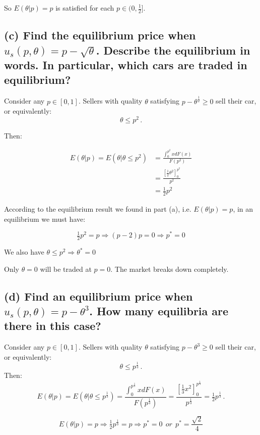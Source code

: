 \documentclass{article}
\begin{document}
So $E(\theta | p) = p$ is satisfied for each $p \in (0,\tfrac12]$.

\subsection*{(c) Find the equilibrium price when $u_s(p, \theta) = p - \sqrt{\theta}$. Describe the equilibrium in words. In
particular, which cars are traded in equilibrium?}

Consider any $p \in [0,1]$. Sellers with quality $\theta$ satisfying $p - \theta^\frac12 \geq 0$ sell their car, or equivalently:$$\theta \leq p^2 \, .$$

Then:

\begin{align*}
E(\theta | p) = E(\theta | \theta \leq p^2) &= \frac{\int_{0}^{p^2}x dF(x)}{F(p^2)} \\
&= \frac{\left[ \tfrac12 \theta^2 \right]^{p^2}_0}{p^2} \\
&= \tfrac12 p^2
\end{align*}

According to the equilibrium result we found in part (a), i.e.
$E(\theta | p) = p$, in an equilibrium we must have:

$$\tfrac12 p^2 = p \Rightarrow (p-2)p = 0 \Rightarrow p^* = 0$$ 

We also have $\theta \leq p^2 \Rightarrow \theta^* = 0$

\medskip

Only $\theta = 0$ will be traded at $p=0$. The market breaks down completely.

\subsection*{(d) Find an equilibrium price when $u_s(p, \theta) = p - \theta^3$. How many equilibria are there in this case?  }

Consider any $p \in [0,1]$. Sellers with quality $\theta$ satisfying $p - \theta^3 \geq 0$ sell their car, or equivalently:$$\theta \leq p^{\tfrac13} \, .$$
Then:
$$E(\theta | p) = E(\theta | \theta \leq p^{\tfrac13})= \frac{\int_{0}^{p^{\frac13}}x dF(x)}{F(p^{\frac13})} = \frac{\left[ \tfrac13 x^2 \right]^{p^{\frac13}}_0}{p^{\frac13}} = \tfrac12 p^{\frac13} \, .$$

$$E(\theta | p) = p \Rightarrow \tfrac12 p^{\frac13} = p \Rightarrow p^*=0 \ \ or \ \ p^*= \frac{\sqrt{2}}{4}$$
\end{document}
